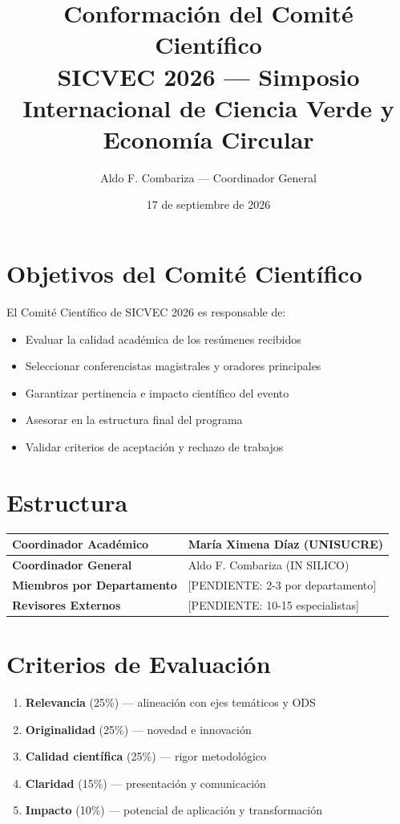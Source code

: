 \documentclass[12pt,a4paper]{article}
\title{\textbf{\color{verdeosc}Conformación del Comité Científico}\\[0.5cm]
{\normalsize SICVEC 2026 — Simposio Internacional de Ciencia Verde y Economía Circular}}
\author{Aldo F. Combariza — Coordinador General}
\date{17 de septiembre de 2026}
\begin{document}
\maketitle

\vspace{0.5cm}

\section*{Objetivos del Comité Científico}

El Comité Científico de SICVEC 2026 es responsable de:

\begin{itemize}
  \item Evaluar la calidad académica de los resúmenes recibidos
  \item Seleccionar conferencistas magistrales y oradores principales
  \item Garantizar pertinencia e impacto científico del evento
  \item Asesorar en la estructura final del programa
  \item Validar criterios de aceptación y rechazo de trabajos
\end{itemize}

\section*{Estructura}

\begin{tabular}{|l|l|}
\hline
\textbf{Coordinador Académico} & María Ximena Díaz (UNISUCRE) \\
\hline
\textbf{Coordinador General} & Aldo F. Combariza (IN SILICO) \\
\hline
\textbf{Miembros por Departamento} & [PENDIENTE: 2-3 por departamento] \\
\hline
\textbf{Revisores Externos} & [PENDIENTE: 10-15 especialistas] \\
\hline
\end{tabular}

\vspace{0.5cm}

\section*{Criterios de Evaluación}

\begin{enumerate}
  \item \textbf{Relevancia} (25\%) — alineación con ejes temáticos y ODS
  \item \textbf{Originalidad} (25\%) — novedad e innovación
  \item \textbf{Calidad científica} (25\%) — rigor metodológico
  \item \textbf{Claridad} (15\%) — presentación y comunicación
  \item \textbf{Impacto} (10\%) — potencial de aplicación y transformación
\end{enumerate}
\end{document}

